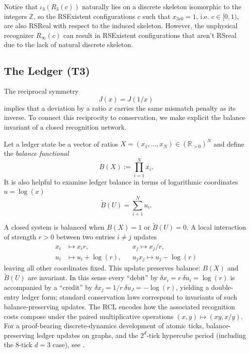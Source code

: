 \documentclass[11pt,a4paper]{article}
\begin{document}
Notice that $\iota_3(R_3(c))$ naturally lies on a discrete skeleton isomorphic to the integers $\mathbb{Z}$, so the RSExistent configurations $c$ such that $x_{3c0}=1$, i.e. $c\in[0,1)$, are also RSReal with respect to the induced skeleton. However, the unphysical recognizer $R_\infty(c)$ can result in RSExistent configurations that aren't RSreal due to the lack of natural discrete skeleton.
\subsection{The Ledger (T3)}
The reciprocal symmetry
\begin{equation}
    J(x) = J(1/x)
\end{equation}
implies that a deviation by a ratio $x$ carries the same mismatch penalty as its inverse. To connect this reciprocity to conservation, we make explicit the balance invariant of a closed recognition network.

Let a ledger state be a vector of ratios $X=(x_1,\dots,x_N)\in(\mathbb{R}_{>0})^N$ and define the \emph{balance functional}
\begin{equation}
    B(X):=\prod_{i=1}^N x_i.\label{balance}
\end{equation}
It is also helpful to examine ledger balance in terms of logarithmic coordinates $u=\log(x)$
\begin{equation}
    \widetilde{B}(U)=\sum_{i=1}^N u_i.
\end{equation}

A closed system is balanced when $B(X)=1$ or $\widetilde{B}(U)=0$. A local interaction of strength $r>0$ between two entries $i\neq j$ updates
\begin{align}
x_i&\mapsto x_i r,&&x_j\mapsto x_j/r,\\
u_i&\mapsto u_i+\log( r),&&u_jx_j\mapsto u_j-\log(r)
\end{align}
leaving all other coordinates fixed. This update preserves balance: $B(X)$ and $\widetilde{B}(U)$ are invariant.
In this sense every ``debit'' by $\delta x_i=r~\delta u_i=\log(r)$ is accompanied by a ``credit'' by $\delta x_j=1/r~\delta u_J=-\log(r)$, yielding a double-entry ledger form; standard conservation laws correspond to invariants of such balance-preserving updates. The RCL encodes how the associated recognition costs compose under the paired multiplicative operations $(x,y)\mapsto(xy,x/y)$.
For a proof-bearing discrete-dynamics development of atomic ticks, balance-preserving ledger updates on graphs, and the $2^{d}$-tick hypercube period (including the $8$-tick $d=3$ case), see \cite{CoherentComparisonLedger}.
\end{document}
